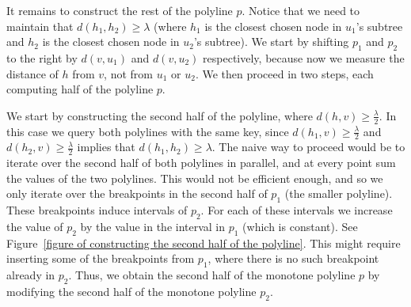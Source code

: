 \documentclass[11pt,a4paper]{article}
\theoremstyle{definition}
\theoremstyle{remark}
\begin{document}
It remains to construct the rest of the polyline $p$. Notice that we need to maintain that $d(h_1,h_2) \geq \lambda$ (where $h_1$ is the closest chosen node in $u_1$'s subtree and $h_2$ is the closest chosen node in $u_2$'s subtree). We start by shifting $p_1$ and $p_2$ to the right by $d(v,u_1)$ and $d(v,u_2)$ respectively, because now we measure the distance of $h$ from $v$, not from $u_1$ or $u_2$. We then proceed in two steps, each computing half of the polyline $p$.

\vspace{0.04in} \label{subsection constructing the second half of the polyline} We start by constructing the second half of the polyline, where $d(h,v) \geq \frac{\lambda}{2}$. In this case we query both polylines with the same key, since $d(h_1,v) \geq \frac{\lambda}{2}$ and $d(h_2,v) \geq \frac{\lambda}{2}$ implies that $d(h_1,h_2) \geq \lambda$. The naive way to proceed would be to iterate over the second half of both polylines in parallel, and at every point sum the values of the two polylines. This would not be efficient enough, and so we only iterate over the breakpoints in the second half of $p_1$ (the smaller polyline). These breakpoints induce intervals of $p_2$. For each of these intervals we increase the value of $p_{2}$ by the value in the interval in $p_1$ (which is constant). See Figure~\ref{figure of constructing the second half of the polyline}. This might require inserting some of the breakpoints from $p_1$, where there is no such breakpoint already in $p_2$. Thus, we obtain the second half of the monotone polyline $p$ by modifying the second half of the monotone polyline $p_{2}$.
\end{document}

